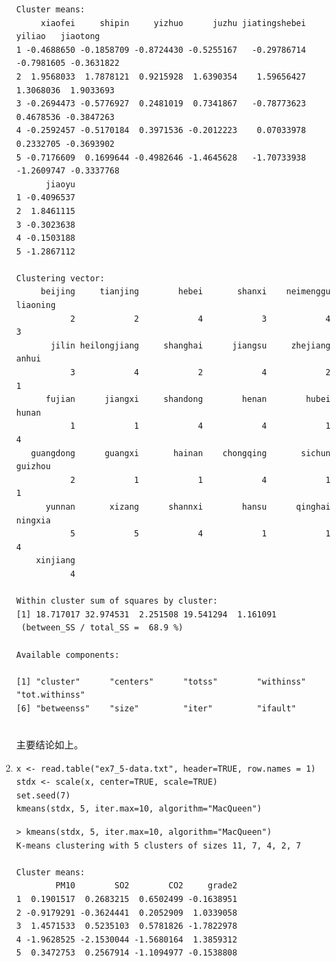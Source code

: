 \begin{enumerate}
\begin{lstlisting}
Cluster means:
     xiaofei     shipin     yizhuo      juzhu jiatingshebei     yiliao   jiaotong
1 -0.4688650 -0.1858709 -0.8724430 -0.5255167   -0.29786714 -0.7981605 -0.3631822
2  1.9568033  1.7878121  0.9215928  1.6390354    1.59656427  1.3068036  1.9033693
3 -0.2694473 -0.5776927  0.2481019  0.7341867   -0.78773623  0.4678536 -0.3847263
4 -0.2592457 -0.5170184  0.3971536 -0.2012223    0.07033978  0.2332705 -0.3693902
5 -0.7176609  0.1699644 -0.4982646 -1.4645628   -1.70733938 -1.2609747 -0.3337768
      jiaoyu
1 -0.4096537
2  1.8461115
3 -0.3023638
4 -0.1503188
5 -1.2867112

Clustering vector:
     beijing     tianjing        hebei       shanxi    neimenggu     liaoning 
           2            2            4            3            4            3 
       jilin heilongjiang     shanghai      jiangsu     zhejiang        anhui 
           3            4            2            4            2            1 
      fujian      jiangxi     shandong        henan        hubei        hunan 
           1            1            4            4            1            4 
   guangdong      guangxi       hainan    chongqing       sichun      guizhou 
           2            1            1            4            1            1 
      yunnan       xizang      shannxi        hansu      qinghai      ningxia 
           5            5            4            1            1            4 
    xinjiang 
           4 

Within cluster sum of squares by cluster:
[1] 18.717017 32.974531  2.251508 19.541294  1.161091
 (between_SS / total_SS =  68.9 %)

Available components:

[1] "cluster"      "centers"      "totss"        "withinss"     "tot.withinss"
[6] "betweenss"    "size"         "iter"         "ifault"
\end{lstlisting}
        \summary\\
        主要结论如上。
        \item
        \code
\begin{lstlisting}
x <- read.table("ex7_5-data.txt", header=TRUE, row.names = 1)
stdx <- scale(x, center=TRUE, scale=TRUE)
set.seed(7)
kmeans(stdx, 5, iter.max=10, algorithm="MacQueen")
\end{lstlisting}
        \out
\begin{lstlisting}
> kmeans(stdx, 5, iter.max=10, algorithm="MacQueen")
K-means clustering with 5 clusters of sizes 11, 7, 4, 2, 7

Cluster means:
        PM10        SO2        CO2     grade2
1  0.1901517  0.2683215  0.6502499 -0.1638951
2 -0.9179291 -0.3624441  0.2052909  1.0339058
3  1.4571533  0.5235103  0.5781826 -1.7822978
4 -1.9628525 -2.1530044 -1.5680164  1.3859312
5  0.3472753  0.2567914 -1.1094977 -0.1538808


\end{lstlisting}
\end{enumerate}
